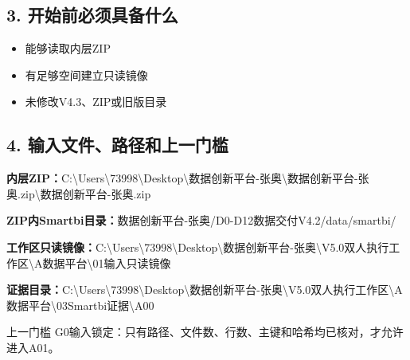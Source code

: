 \documentclass[UTF8,openany,zihao=-4]{ctexbook}
\renewcommand{\_}{\textunderscore\allowbreak}
\begin{document}
\subsection*{3. 开始前必须具备什么}
\begin{itemize}[label=$\square$]
\item 能够读取内层ZIP
\item 有足够空间建立只读镜像
\item 未修改V4.3、ZIP或旧版目录
\end{itemize}

\subsection*{4. 输入文件、路径和上一门槛}
\noindent\textbf{内层ZIP：}{\promptlatin\promptcjk\small C:\textbackslash{}\allowbreak{}Users\textbackslash{}\allowbreak{}73998\textbackslash{}\allowbreak{}Desktop\textbackslash{}\allowbreak{}数据创新平台-\allowbreak{}张奥\textbackslash{}\allowbreak{}数据创新平台-\allowbreak{}张奥.zip\textbackslash{}\allowbreak{}数据创新平台-\allowbreak{}张奥.zip}\par
\noindent\textbf{ZIP内Smartbi目录：}{\promptlatin\promptcjk\small 数据创新平台-\allowbreak{}张奥/\allowbreak{}D0-\allowbreak{}D12\_\allowbreak{}数据交付\_\allowbreak{}V4.2/\allowbreak{}data/\allowbreak{}smartbi/\allowbreak{}}\par
\noindent\textbf{工作区只读镜像：}{\promptlatin\promptcjk\small C:\textbackslash{}\allowbreak{}Users\textbackslash{}\allowbreak{}73998\textbackslash{}\allowbreak{}Desktop\textbackslash{}\allowbreak{}数据创新平台-\allowbreak{}张奥\textbackslash{}\allowbreak{}V5.0\_\allowbreak{}双人执行工作区\textbackslash{}\allowbreak{}A\_\allowbreak{}数据平台\textbackslash{}\allowbreak{}01\_\allowbreak{}输入只读镜像}\par
\noindent\textbf{证据目录：}{\promptlatin\promptcjk\small C:\textbackslash{}\allowbreak{}Users\textbackslash{}\allowbreak{}73998\textbackslash{}\allowbreak{}Desktop\textbackslash{}\allowbreak{}数据创新平台-\allowbreak{}张奥\textbackslash{}\allowbreak{}V5.0\_\allowbreak{}双人执行工作区\textbackslash{}\allowbreak{}A\_\allowbreak{}数据平台\textbackslash{}\allowbreak{}03\_\allowbreak{}Smartbi证据\textbackslash{}\allowbreak{}A00}\par
\begin{gatebox}{上一门槛}
G0输入锁定：只有路径、文件数、行数、主键和哈希均已核对，才允许进入A01。

\end{gatebox}
\end{document}
